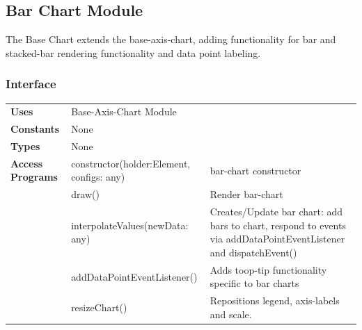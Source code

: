 \documentclass[12pt, titlepage]{article}
\begin{document}
\newpage
\subsection{Bar Chart Module}
The Base Chart extends the base-axis-chart, adding functionality for bar and stacked-bar rendering functionality and data point labeling.
\subsubsection{Interface}
\begin{table}[H]
\begin{tabular}{l p{5cm}p{5cm}}
\textbf{Uses}            & Base-Axis-Chart Module                     &                                                                                                                  \\
\textbf{Constants}       & None                                     &                 \\
\textbf{Types}           & None                                       &                                                                                                                  \\
\textbf{Access Programs} & constructor(holder:Element, configs: any) & bar-chart constructor                                                                                            \\
                         & draw()                                     & Render bar-chart                                                                                                 \\
                         & interpolateValues(newData: any)            & Creates/Update bar chart: add bars to chart, respond to events via addDataPointEventListener and dispatchEvent() \\
                         & addDataPointEventListener()                & Adds toop-tip functionality specific to bar charts                                                               \\
                         & resizeChart()                              & Repositions legend, axis-labels and scale.\\                                                                     
\end{tabular}
\end{table}




\newpage
\end{document}
